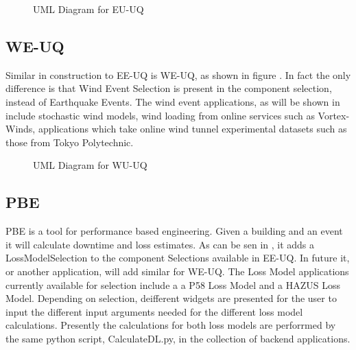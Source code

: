  \begin{figure}[!htbp]
  \caption{UML Diagram for EU-UQ}
  \label{fig:umlEE}
\end{figure}


\subsection{WE-UQ}
Similar in  construction to EE-UQ is WE-UQ, as shown in figure .  In fact the only difference is that Wind Event Selection is present in the component selection, instead of Earthquake Events. The wind event applications, as will be shown in  include stochastic wind models, wind loading from online services such as Vortex-Winds, applications which take online wind tunnel experimental datasets such as those from Tokyo Polytechnic.


 \begin{figure}[!htbp]
  \caption{UML Diagram for WU-UQ}
  \label{fig:umlWE}
\end{figure}

 

\subsection{PBE}

 PBE is a tool for performance based engineering. Given a building and an event it will calculate downtime and loss estimates. As can be sen in ,  it adds a LossModelSelection to the component Selections available in EE-UQ. In future it, or another application, will add similar for WE-UQ.
The Loss Model applications currently available for selection include a a P58 Loss Model and a HAZUS Loss Model. Depending on selection, deifferent widgets are presented for the user to input the different input arguments needed for the different loss model calculations. Presently the calculations for both loss models are perforrmed by the same python script, CalculateDL.py, in the collection of backend applications.
 
